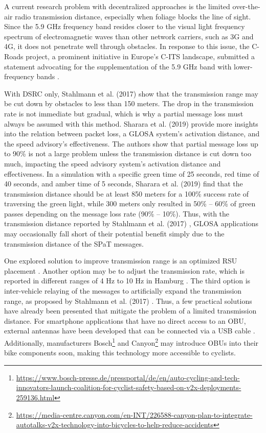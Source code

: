 A current research problem with decentralized approaches is the limited over-the-air radio transmission distance, especially when foliage blocks the line of sight. Since the 5.9 GHz frequency band resides closer to the visual light frequency spectrum of electromagnetic waves than other network carriers, such as 3G and 4G, it does not penetrate well through obstacles. In response to this issue, the C-Roads project, a prominent initiative in Europe's C-ITS landscape, submitted a statement advocating for the supplementation of the 5.9 GHz band with lower-frequency bands \cite{bohm_radio_2017}.

With DSRC only, Stahlmann et al. (2017) \cite{stahlmann_multi-hop_2017} show that the transmission range may be cut down by obstacles to less than 150 meters. The drop in the transmission rate is not immediate but gradual, which is why a partial message loss must always be assumed with this method. Sharara et al. (2019) \cite{sharara_impact_2019} provide more insights into the relation between packet loss, a GLOSA system's activation distance, and the speed advisory's effectiveness. The authors show that partial message loss up to 90\% is not a large problem unless the transmission distance is cut down too much, impacting the speed advisory system's activation distance and effectiveness. In a simulation with a specific green time of 25 seconds, red time of 40 seconds, and amber time of 5 seconds, Sharara et al. (2019) \cite{sharara_impact_2019} find that the transmission distance should be at least 850 meters for a 100\% success rate of traversing the green light, while 300 meters only resulted in 50\% -- 60\% of green passes depending on the message loss rate (90\% -- 10\%). Thus, with the transmission distance reported by Stahlmann et al. (2017) \cite{stahlmann_multi-hop_2017}, GLOSA applications may occasionally fall short of their potential benefit simply due to the transmission distance of the SPaT messages.

One explored solution to improve transmission range is an optimized RSU placement \cite{mehar_optimized_2015, massobrio_smart_2015, al-ezaly_optimal_2020}. Another option may be to adjust the transmission rate, which is reported in different ranges of 4 Hz \cite{stahlmann_multi-hop_2017} to 10 Hz in Hamburg \cite{stegen_ideas_2021}. The third option is inter-vehicle relaying of the messages to artificially expand the transmission range, as proposed by Stahlmann et al. (2017) \cite{stahlmann_multi-hop_2017}. Thus, a few practical solutions have already been presented that mitigate the problem of a limited transmission distance. For smartphone applications that have no direct access to an OBU, external antennas have been developed that can be connected via a USB cable \cite{kim_vulnerable_2017}. Additionally, manufacturers Bosch\footnote{\url{https://www.bosch-presse.de/pressportal/de/en/auto-cycling-and-tech-innovators-launch-coalition-for-cyclist-safety-based-on-v2x-deployments-259136.html}} and Canyon\footnote{\url{https://media-centre.canyon.com/en-INT/226588-canyon-plan-to-integrate-autotalks-v2x-technology-into-bicycles-to-help-reduce-accidents}} may introduce OBUs into their bike components soon, making this technology more accessible to cyclists.

